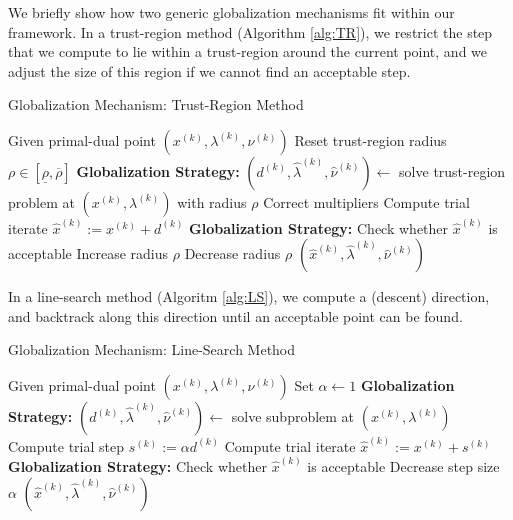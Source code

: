 We briefly show how two generic globalization mechanisms fit within our framework.
In a trust-region method (Algorithm \ref{alg:TR}), we restrict the step that we compute to lie within a trust-region around
the current point, and we adjust the size of this region if we cannot find an acceptable step.

\begin{algorithm}[h!]
\caption{\solvername{} Globalization Mechanism: Trust-Region Method}
\label{alg:TR}
\SetAlgoVlined
Given primal-dual point $(x^{(k)}, \lambda^{(k)}, \nu^{(k)})$ \;
Reset trust-region radius $\rho \in [\underline{\rho}, \overline{\rho}]$ \;
 {
	\globalizationstrategy \textbf{Globalization Strategy:} \;
	\globalizationstrategy $(d^{(k)}, \hat{\lambda}^{(k)}, \hat{\nu}^{(k)}) \gets$ solve trust-region problem at $(x^{(k)}, \lambda^{(k)})$ with radius $\rho$ \;
	Correct multipliers \;
	Compute trial iterate $\hat{x}^{(k)} := x^{(k)} + d^{(k)}$ \;
	\globalizationstrategy \textbf{Globalization Strategy:} \;
	\globalizationstrategy Check whether $\hat{x}^{(k)}$ is acceptable \;
	 {
		 {
			Increase radius $\rho$ \;
		}
	}{
		Decrease radius $\rho$ \;
	}
}
\Return $(\hat{x}^{(k)}, \hat{\lambda}^{(k)}, \hat{\nu}^{(k)})$ \;
\end{algorithm}

In a line-search method (Algoritm \ref{alg:LS}), we compute a (descent) direction, and backtrack along this direction
until an acceptable point can be found.

\begin{algorithm}[h!]
\caption{\solvername{} Globalization Mechanism: Line-Search Method}
\label{alg:LS}
\SetAlgoVlined
Given primal-dual point $(x^{(k)}, \lambda^{(k)}, \nu^{(k)})$ \;
Set $\alpha \gets 1$ \;
\globalizationstrategy \textbf{Globalization Strategy:} \;
\globalizationstrategy $(d^{(k)}, \hat{\lambda}^{(k)}, \hat{\nu}^{(k)}) \gets$ solve subproblem at $(x^{(k)}, \lambda^{(k)})$ \;
 {
	Compute trial step $s^{(k)} := \alpha d^{(k)}$ \;
	Compute trial iterate $\hat{x}^{(k)} := x^{(k)} + s^{(k)}$ \;
	\globalizationstrategy \textbf{Globalization Strategy:} \;
	\globalizationstrategy Check whether $\hat{x}^{(k)}$ is acceptable \;
	 {
		Decrease step size $\alpha$ \;
	}
}
\Return $(\hat{x}^{(k)}, \hat{\lambda}^{(k)}, \hat{\nu}^{(k)})$ \;
\end{algorithm}

